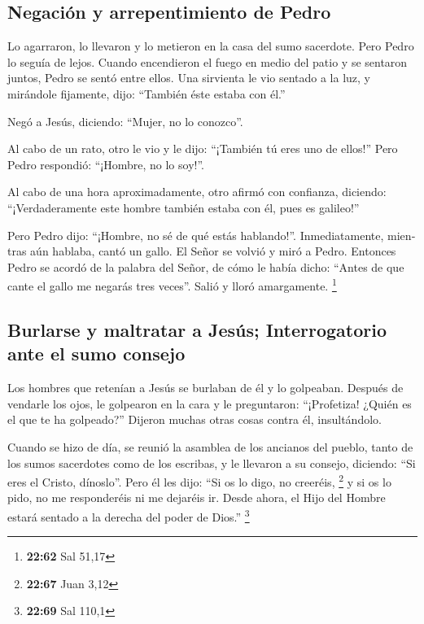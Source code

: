 \begin{paracol}{2}
\begin{otherlanguage}{english}
\hypertarget{negaciuxf3n-y-arrepentimiento-de-pedro}{%
\subsection{Negación y arrepentimiento de
Pedro}\label{negaciuxf3n-y-arrepentimiento-de-pedro}}

 Lo agarraron, lo llevaron y lo metieron en la casa del
sumo sacerdote. Pero Pedro lo seguía de lejos.  Cuando
encendieron el fuego en medio del patio y se sentaron juntos, Pedro se
sentó entre ellos.  Una sirvienta le vio sentado a la
luz, y mirándole fijamente, dijo: ``También éste estaba con él.''

 Negó a Jesús, diciendo: ``Mujer, no lo conozco''.

 Al cabo de un rato, otro le vio y le dijo: ``¡También tú
eres uno de ellos!'' Pero Pedro respondió: ``¡Hombre, no lo soy!''.

 Al cabo de una hora aproximadamente, otro afirmó con
confianza, diciendo: ``¡Verdaderamente este hombre también estaba con
él, pues es galileo!''

 Pero Pedro dijo: ``¡Hombre, no sé de qué estás
hablando!''. Inmediatamente, mientras aún hablaba, cantó un gallo.
 El Señor se volvió y miró a Pedro. Entonces Pedro se
acordó de la palabra del Señor, de cómo le había dicho: ``Antes de que
cante el gallo me negarás tres veces''.  Salió y lloró
amargamente. \footnote{\textbf{22:62} Sal 51,17}

\hypertarget{burlarse-y-maltratar-a-jesuxfas-interrogatorio-ante-el-sumo-consejo}{%
\subsection{Burlarse y maltratar a Jesús; Interrogatorio ante el sumo
consejo}\label{burlarse-y-maltratar-a-jesuxfas-interrogatorio-ante-el-sumo-consejo}}

 Los hombres que retenían a Jesús se burlaban de él y lo
golpeaban.  Después de vendarle los ojos, le golpearon en
la cara y le preguntaron: ``¡Profetiza! ¿Quién es el que te ha
golpeado?''  Dijeron muchas otras cosas contra él,
insultándolo.

 Cuando se hizo de día, se reunió la asamblea de los
ancianos del pueblo, tanto de los sumos sacerdotes como de los escribas,
y le llevaron a su consejo, diciendo:  ``Si eres el
Cristo, dínoslo''. Pero él les dijo: ``Si os lo digo, no creeréis,
\footnote{\textbf{22:67} Juan 3,12}  y si os lo pido, no
me responderéis ni me dejaréis ir.  Desde ahora, el Hijo
del Hombre estará sentado a la derecha del poder de Dios.'' \footnote{\textbf{22:69}
  Sal 110,1}


\end{otherlanguage}
\end{paracol}
